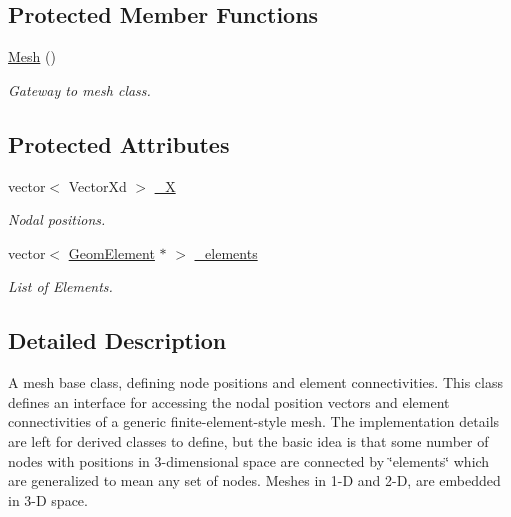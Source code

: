 \subsection*{Protected Member Functions}
\begin{DoxyCompactItemize}
\item 
\hyperlink{classvoom_1_1_mesh_a6bb4b6118d3eeffcbea587aa8c533ac0}{Mesh} ()
\begin{DoxyCompactList}\small\item\em Gateway to mesh class. \item\end{DoxyCompactList}\end{DoxyCompactItemize}
\subsection*{Protected Attributes}
\begin{DoxyCompactItemize}
\item 
\hypertarget{classvoom_1_1_mesh_a1d13a8316f0939c287a6b8eced616fd3}{
vector$<$ VectorXd $>$ \hyperlink{classvoom_1_1_mesh_a1d13a8316f0939c287a6b8eced616fd3}{\_\-X}}
\label{classvoom_1_1_mesh_a1d13a8316f0939c287a6b8eced616fd3}

\begin{DoxyCompactList}\small\item\em Nodal positions. \item\end{DoxyCompactList}\item 
\hypertarget{classvoom_1_1_mesh_a4212ded8cfc10996d343d21734cbd6d4}{
vector$<$ \hyperlink{classvoom_1_1_geom_element}{GeomElement} $\ast$ $>$ \hyperlink{classvoom_1_1_mesh_a4212ded8cfc10996d343d21734cbd6d4}{\_\-elements}}
\label{classvoom_1_1_mesh_a4212ded8cfc10996d343d21734cbd6d4}

\begin{DoxyCompactList}\small\item\em List of Elements. \item\end{DoxyCompactList}\end{DoxyCompactItemize}


\subsection{Detailed Description}
A mesh base class, defining node positions and element connectivities. This class defines an interface for accessing the nodal position vectors and element connectivities of a generic finite-\/element-\/style mesh. The implementation details are left for derived classes to define, but the basic idea is that some number of nodes with positions in 3-\/dimensional space are connected by \char`\"{}elements\char`\"{} which are generalized to mean any set of nodes. Meshes in 1-\/D and 2-\/D, are embedded in 3-\/D space.

